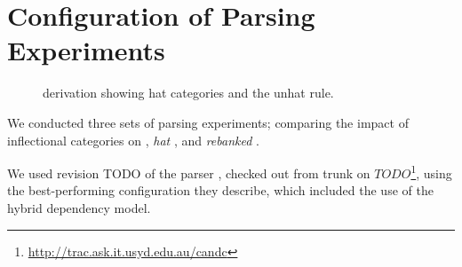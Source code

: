 \documentclass[11pt]{article}
\begin{document}
\section{Configuration of Parsing Experiments}
\begin{figure*}
\small
\centering
{}
\caption{\ccg derivation showing hat categories and the unhat rule.\label{fig:hat_deriv}}
\end{figure*}

We conducted three sets of parsing experiments; comparing the impact
of inflectional categories on \ccgbank \citep{hock:cl07},
\citet{honnibal:09} \emph{hat} \ccgbank \citep{honnibal:09}, and 
\emph{rebanked} \ccgbank \citep{honnibal:10}.

We used revision TODO of the \candc parser \citep{clark:cl07}, checked
out from trunk on  $TODO$\footnote{\url{http://trac.ask.it.usyd.edu.au/candc}},
using the best-performing configuration they describe, which included the use
of the hybrid dependency model.
\end{document}
